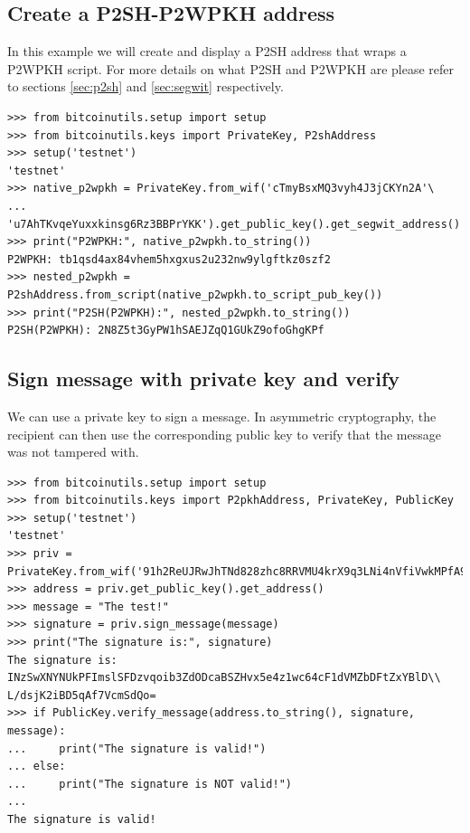 \subsection*{Create a P2SH-P2WPKH address}
In this example we will create and display a P2SH address that wraps a P2WPKH script. For more details on what P2SH and P2WPKH are please refer to sections \ref{sec:p2sh} and \ref{sec:segwit} respectively.

\vspace{1em}
\begin{lstlisting}[style=Python]
>>> from bitcoinutils.setup import setup
>>> from bitcoinutils.keys import PrivateKey, P2shAddress 
>>> setup('testnet')
'testnet'
>>> native_p2wpkh = PrivateKey.from_wif('cTmyBsxMQ3vyh4J3jCKYn2A'\
...         'u7AhTKvqeYuxxkinsg6Rz3BBPrYKK').get_public_key().get_segwit_address()
>>> print("P2WPKH:", native_p2wpkh.to_string())
P2WPKH: tb1qsd4ax84vhem5hxgxus2u232nw9ylgftkz0szf2
>>> nested_p2wpkh = P2shAddress.from_script(native_p2wpkh.to_script_pub_key())
>>> print("P2SH(P2WPKH):", nested_p2wpkh.to_string())
P2SH(P2WPKH): 2N8Z5t3GyPW1hSAEJZqQ1GUkZ9ofoGhgKPf
\end{lstlisting}
\vspace{1em}


\subsection*{Sign message with private key and verify}
We can use a private key to sign a message. In asymmetric cryptography, the recipient can then use the corresponding public key to verify that the message was not tampered with.

\vspace{1em}
\begin{lstlisting}[style=Python,label={lst:sign-verify-message},caption={Use public key to sign a message and them verify},captionpos=b]
>>> from bitcoinutils.setup import setup
>>> from bitcoinutils.keys import P2pkhAddress, PrivateKey, PublicKey
>>> setup('testnet')
'testnet'
>>> priv = PrivateKey.from_wif('91h2ReUJRwJhTNd828zhc8RRVMU4krX9q3LNi4nVfiVwkMPfA9p')
>>> address = priv.get_public_key().get_address()
>>> message = "The test!"
>>> signature = priv.sign_message(message)
>>> print("The signature is:", signature)
The signature is: INzSwXNYNUkPFImslSFDzvqoib3ZdODcaBSZHvx5e4z1wc64cF1dVMZbDFtZxYBlD\\
L/dsjK2iBD5qAf7VcmSdQo=
>>> if PublicKey.verify_message(address.to_string(), signature, message):
...     print("The signature is valid!")
... else:
...     print("The signature is NOT valid!")
...
The signature is valid!
\end{lstlisting}
\vspace{1em}

